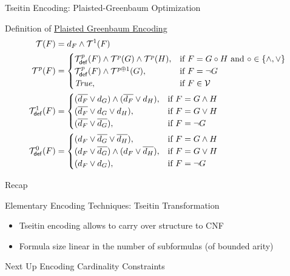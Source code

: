 \documentclass[t]{sdqbeamer}
\begin{document}
\begin{frame}{Tseitin Encoding: Plaisted-Greenbaum Optimization}
\begin{block}{Definition of \href{http://dx.doi.org/10.1016/S0747-7171(86)80028-1}{Plaisted Greenbaum Encoding}}
	\vspace*{-3ex}
	\begin{align*}
	\tseitin{F} &= d_F \wedge \tseitinRec{F}{1}\\
	\tseitinRec{F}{p} &= \begin{cases}
			\tseitinDef{F}{p} \wedge \tseitinRec{G}{p} \wedge \tseitinRec{H}{p},
				& \text{if } F = G \circ H \text{ and } \circ \in \{\wedge, \vee\}\\
			\tseitinDef{F}{p} \wedge \tseitinRec{G}{p \oplus 1}, & \text{if } F = \neg G\\
			\true, & \text{if } F \in \allvars
		\end{cases}\\
	\tseitinDef{F}{1} &= \begin{cases}
			(\overline{d_F} \vee d_G) \wedge (\overline{d_F} \vee d_H), & \text{if } F = G \wedge H\\
			(\overline{d_F} \vee d_G \vee d_H), & \text{if } F = G \vee H\\
			(\overline{d_F} \vee \overline{d_G}), & \text{if } F = \neg G\\
			\end{cases}\\
	\tseitinDef{F}{0} &= \begin{cases}
			(d_F \vee \overline{d_G} \vee \overline{d_H}), & \text{if } F = G \wedge H\\
			(d_F \vee \overline{d_G}) \wedge (d_F \vee \overline{d_H}), & \text{if } F = G \vee H\\ 
			(d_F \vee d_G), & \text{if } F = \neg G
		\end{cases}
	\end{align*}
\end{block}
\end{frame}


\begin{frame}{Recap}

\begin{block}{Elementary Encoding Techniques: Tseitin Transformation}
	\begin{itemize}\setlength{\itemsep}{1em}
		\item Tseitin encoding allows to carry over structure to CNF
		\item Formula size linear in the number of subformulas (of bounded arity)
	\end{itemize}
\end{block}
\begin{block}{Next Up}
	Encoding Cardinality Constraints
\end{block}

\end{frame}
\end{document}
